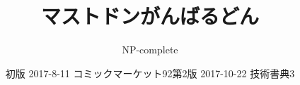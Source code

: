 \title{マストドンがんばるどん}
\author{NP-complete}
\date{初版 2017-8-11 コミックマーケット92}
\date{第2版 2017-10-22 技術書典3}
\Huge
\maketitle
\normalsize
